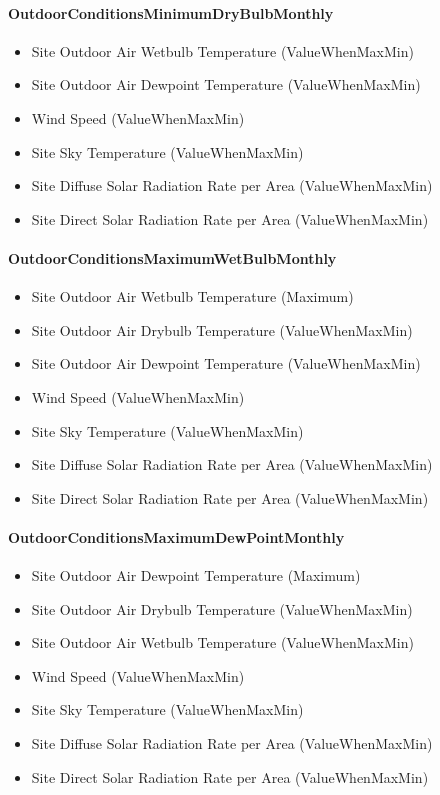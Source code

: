 \paragraph{OutdoorConditionsMinimumDryBulbMonthly}\label{outdoorconditionsminimumdrybulbmonthly}

\begin{itemize}
\item
  Site Outdoor Air Wetbulb Temperature (ValueWhenMaxMin)
\item
  Site Outdoor Air Dewpoint Temperature (ValueWhenMaxMin)
\item
  Wind Speed (ValueWhenMaxMin)
\item
  Site Sky Temperature (ValueWhenMaxMin)
\item
  Site Diffuse Solar Radiation Rate per Area (ValueWhenMaxMin)
\item
  Site Direct Solar Radiation Rate per Area (ValueWhenMaxMin)
\end{itemize}

\paragraph{OutdoorConditionsMaximumWetBulbMonthly}\label{outdoorconditionsmaximumwetbulbmonthly}

\begin{itemize}
\item
  Site Outdoor Air Wetbulb Temperature (Maximum)
\item
  Site Outdoor Air Drybulb Temperature (ValueWhenMaxMin)
\item
  Site Outdoor Air Dewpoint Temperature (ValueWhenMaxMin)
\item
  Wind Speed (ValueWhenMaxMin)
\item
  Site Sky Temperature (ValueWhenMaxMin)
\item
  Site Diffuse Solar Radiation Rate per Area (ValueWhenMaxMin)
\item
  Site Direct Solar Radiation Rate per Area (ValueWhenMaxMin)
\end{itemize}

\paragraph{OutdoorConditionsMaximumDewPointMonthly}\label{outdoorconditionsmaximumdewpointmonthly}

\begin{itemize}
\item
  Site Outdoor Air Dewpoint Temperature (Maximum)
\item
  Site Outdoor Air Drybulb Temperature (ValueWhenMaxMin)
\item
  Site Outdoor Air Wetbulb Temperature (ValueWhenMaxMin)
\item
  Wind Speed (ValueWhenMaxMin)
\item
  Site Sky Temperature (ValueWhenMaxMin)
\item
  Site Diffuse Solar Radiation Rate per Area (ValueWhenMaxMin)
\item
  Site Direct Solar Radiation Rate per Area (ValueWhenMaxMin)
\end{itemize}

